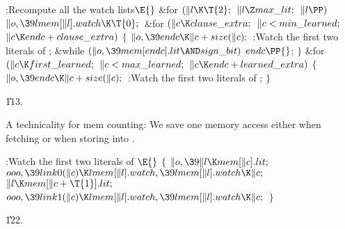 \B{}:Recompute all the watch lists\X${}\E{}$\6
\&{for} ${}(\|l\K\T{2};{}$ ${}\|l\Z\\{max\_lit};{}$ ${}\|l\PP){}$\1\5
${}\|o,\39\\{lmem}[\|l].\\{watch}\K\T{0};{}$\2\6
\&{for} ${}(\|c\K\\{clause\_extra};{}$ ${}\|c<\\{min\_learned};{}$ ${}\|c\K%
\\{endc}+\\{clause\_extra}){}$\5
${}\{{}$\1\6
${}\|o,\39\\{endc}\K\|c+\\{size}(\|c);{}$\6
:Watch the first two literals of \X;\6
\&{while} ${}(\|o,\39\\{mem}[\\{endc}].\\{lit}\AND\\{sign\_bit}){}$\1\5
${}\\{endc}\PP{}$;\2\6
\4${}\}{}$\2\6
\&{for} ${}(\|c\K\\{first\_learned};{}$ ${}\|c<\\{max\_learned};{}$ ${}\|c\K%
\\{endc}+\\{learned\_extra}){}$\5
${}\{{}$\1\6
${}\|o,\39\\{endc}\K\|c+\\{size}(\|c);{}$\6
:Watch the first two literals of \X;\6
\4${}\}{}$\2\par
\U113.\fi

A technicality for mem counting: We save one memory access
either when
fetching  or when storing into .

\Y\B\4:Watch the first two literals of \X${}\E{}$\6
${}\{{}$\1\6
${}\|o,\39\|l\K\\{mem}[\|c].\\{lit};{}$\6
${}\\{ooo},\39\\{link0}(\|c)\K\\{lmem}[\|l].\\{watch},\39\\{lmem}[\|l].%
\\{watch}\K\|c;{}$\6
${}\|l\K\\{mem}[\|c+\T{1}].\\{lit};{}$\6
${}\\{ooo},\39\\{link1}(\|c)\K\\{lmem}[\|l].\\{watch},\39\\{lmem}[\|l].%
\\{watch}\K\|c;{}$\6
\4${}\}{}$\2\par
\U122.\fi

